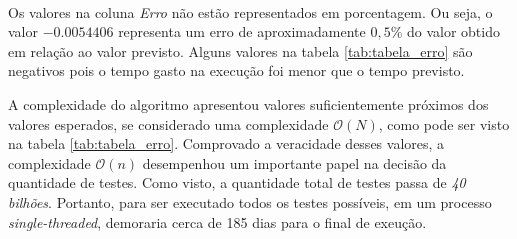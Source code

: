 \documentclass[a4paper,12pt,oneside]{report}
\begin{document}
\\
\par Os valores na coluna \emph{Erro} n\~{a}o est\~{a}o representados em porcentagem. Ou seja, o valor $-0.0054406$ representa um erro de aproximadamente $0,5$\% do valor obtido em rela\c{c}\~{a}o ao valor previsto. Alguns valores na tabela \ref{tab:tabela_erro} s\~{a}o negativos pois o tempo gasto na execu\c{c}\~{a}o foi menor que o tempo previsto. 
\\
\par A complexidade do algoritmo apresentou valores suficientemente pr\'{o}ximos dos valores esperados, se considerado uma complexidade $\mathcal{O} (N)$, como pode ser visto na tabela \ref{tab:tabela_erro}. Comprovado a veracidade desses valores, a complexidade $\mathcal{O}(n)$ desempenhou um importante papel na decis\~{a}o da quantidade de testes. Como visto, a quantidade total de testes passa de \emph{40 bilh\~{o}es}. Portanto, para ser executado todos os testes poss\'{i}veis, em um processo \emph{single-threaded}, demoraria cerca de 185 dias para o final de exeu\c{c}\~{a}o. 
\end{document}
